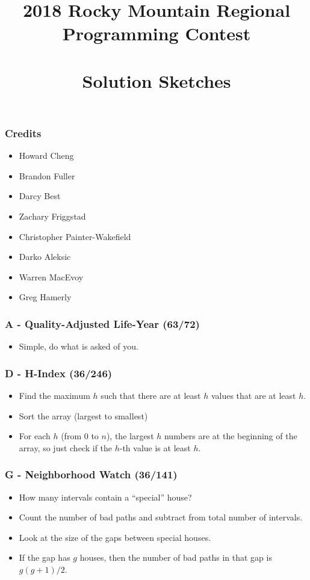 \documentclass{beamer}
\title[RMRC 2018 Solution Sketches]
{2018 Rocky Mountain Regional \\ Programming Contest \\ \ \\ Solution Sketches}
\date
{}
\begin{document}
\begin{frame}
\titlepage
\end{frame}
\begin{frame}
\frametitle{Credits}
\begin{itemize}
\setlength\itemsep{0.5\baselineskip}
\item Howard Cheng
\item Brandon Fuller
\item Darcy Best
\item Zachary Friggstad
\item Christopher Painter-Wakefield
\item Darko Aleksic
\item Warren MacEvoy
\item Greg Hamerly
\end{itemize}
\end{frame}


\begin{frame}
\frametitle{A - Quality-Adjusted Life-Year (63/72)}
\begin{itemize}
\setlength\itemsep{0.5\baselineskip}
\item Simple, do what is asked of you.
\end{itemize}
\end{frame}


\begin{frame}
\frametitle{D - H-Index (36/246)}
\begin{itemize}
  \setlength\itemsep{0.5\baselineskip}
\item Find the maximum $h$ such that there are at least $h$ values that are at least $h$.
\item Sort the array (largest to smallest)
\item For each $h$ (from $0$ to $n$), the largest $h$ numbers are at the beginning of the array, so just check if the $h$-th value is at least $h$.
\end{itemize}
\end{frame}


\begin{frame}
\frametitle{G - Neighborhood Watch (36/141)}
\begin{itemize}
\setlength\itemsep{0.5\baselineskip}
\item How many intervals contain a ``special'' house?
\item Count the number of bad paths and subtract from total number of intervals.
\item Look at the size of the gaps between special houses.
\item If the gap has $g$ houses, then the number of bad paths in that gap is $g(g+1)/2$.
\end{itemize}
\end{frame}
\end{document}
